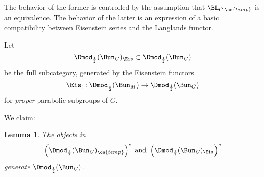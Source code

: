 \documentclass[9pt]{amsart}
\newtheorem{lem}[subsubsection]{Lemma}
\theoremstyle{remark}
\theoremstyle{definition}
\theoremstyle{remark}
\numberwithin{equation}{section}
\begin{document}
\medskip

The behavior of the former is controlled by the
assumption that $\BL_{G,\on{temp}}$ is an equivalence. 
The behavior of the latter is an expression of a basic compatibility between Eisenstein series and the
Langlands functor. 

\sssec{}

Let 
$$\Dmod_{\frac{1}{2}}(\Bun_G)_{\Eis}\subset \Dmod_{\frac{1}{2}}(\Bun_G)$$
be the full subcategory, generated by the Eisenstein functors 
$$\Eis_!:\Dmod_{\frac{1}{2}}(\Bun_M)\to \Dmod_{\frac{1}{2}}(\Bun_G)$$
for \emph{proper} parabolic subgroups of $G$. 

\sssec{}

We claim:

\begin{lem} \label{l:temp and Eis gen}
The objects in
$$\left(\Dmod_{\frac{1}{2}}(\Bun_G)_{\on{temp}}\right)^c \text{ and } \left(\Dmod_{\frac{1}{2}}(\Bun_G)_{\Eis}\right)^c$$
generate $\Dmod_{\frac{1}{2}}(\Bun_G)$.
\end{lem}
\end{document}

